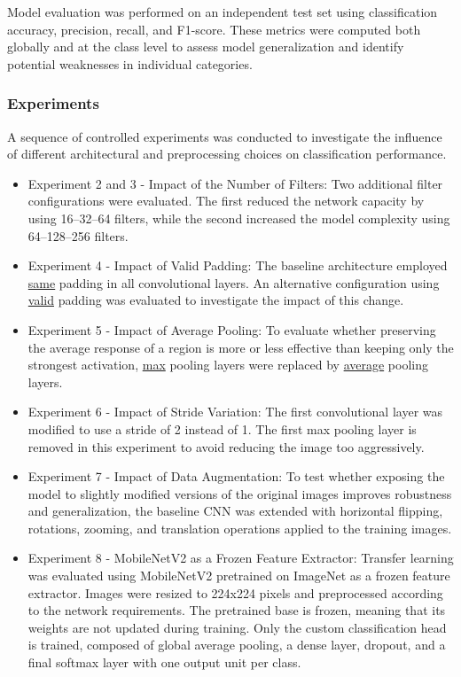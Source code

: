 \documentclass[conference]{IEEEtran}
\begin{document}
Model evaluation was performed on an independent test set using classification accuracy, precision, recall, and F1-score. These metrics were computed both globally and at the class level to assess model generalization and identify potential weaknesses in individual categories.

\subsubsection{Experiments}

A sequence of controlled experiments was conducted to investigate the influence of different architectural and preprocessing choices on classification performance.
\begin{itemize}

\item{Experiment 2 and 3 - Impact of the Number of Filters:} Two additional filter configurations were evaluated. The first reduced the network capacity by using 16–32–64 filters, while the second increased the model complexity using 64–128–256 filters.

\item{Experiment 4 - Impact of Valid Padding:} The baseline architecture employed \underline{same} padding in all convolutional layers. An alternative configuration using \underline{valid} padding was evaluated to investigate the impact of this change.

\item{Experiment 5 - Impact of Average Pooling:} To evaluate whether preserving the average response of a region is more or less effective than keeping only the strongest activation, \underline{max} pooling layers were replaced by \underline{average} pooling layers.

\item{Experiment 6 - Impact of Stride Variation:} The first convolutional layer was modified to use a stride of 2 instead of 1. The first max pooling layer is removed in this experiment to avoid reducing the image too aggressively.

\item{Experiment 7 - Impact of Data Augmentation:} To test whether exposing the model to slightly modified versions of the original images improves robustness and generalization, the baseline CNN was extended with  horizontal flipping, rotations, zooming, and translation operations applied to the training images.

\item{Experiment 8 - MobileNetV2 as a Frozen Feature Extractor:} Transfer learning was evaluated using MobileNetV2 pretrained on ImageNet as a frozen feature extractor. Images were resized to 224x224 pixels and preprocessed according to the network requirements. The pretrained base is frozen, meaning that its weights are not updated during training. Only the custom classification head is trained, composed of global average pooling, a dense layer, dropout, and a final softmax layer with one output unit per class.
\end{itemize}
\end{document}
